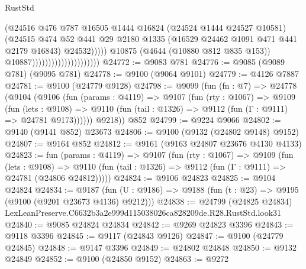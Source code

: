 \begin{lexlean}{RustStd}
\begin{coremodule}
                                                    (@24516
                                                      @476
                                                      @787
                                                      @16505
                                                      @1444
                                                      @16824
                                                      (@24524 @1444 @24527 @10581)
                                                      (@24515
                                                        @474
                                                        @52
                                                        @441
                                                        @29
                                                        @2180
                                                        @1335
                                                        (@16529 @24462 @1091 @471 @441 @2179 @16843)
                                                        @24532)))))
                                              @10875
                                              (@4644 (@10880 @812 @835 @153))
                                              @10887)))))))))))))))))))))
@24772 := @9083 @781
@24776 := @9085 (@9089 @781) (@9095 @781)
@24778 := @9100 (@9064 @9101)
@24779 := @4126 @7887
@24781 := @9100 (@24779 @9128)
@24798 := @9099
    (fun (fn : @7) =>
    @24778
      (@9104
        (@9106
          (fun (params : @4119) =>
          @9107
            (fun (rty : @1067) =>
            @9109
              (fun (lets : @9108) =>
              @9110 (fun (tail : @1326) => @9112 (fun (Γ : @9111) => @24781 @9173))))))
        @9218))
    @852
@24799 := @9224 @9066
@24802 := @9140 (@9141 @852) @23673
@24806 := @9100 (@9132 (@24802 @9148) @9152)
@24807 := @9164 @852
@24812 := @9161 (@9163 @24807 @23676 @4130 @4133)
@24823 := fun (params : @4119) =>
  @9107
    (fun (rty : @1067) =>
    @9109
      (fun (lets : @9108) =>
      @9110 (fun (tail : @1326) => @9112 (fun (Γ : @9111) => @24781 (@24806 @24812)))))
@24824 := @9106 @24823
@24825 := @9104 @24824
@24834 := @9187
    (fun (U : @9186) => @9188 (fun (t : @23) => @9195 (@9100 (@9201 @23673 @4136) @9212)))
@24838 := @24799
    (@24825 @24834)
    LexLeanPreserve.C6632b3a2e999d115038026ca828209de.R28.RustStd.look31
@24840 := @9085 @24824 @24834
@24842 := @9269 @24823 @3396
@24843 := @9118 @3396
@24845 := @9117 (@24843 @9126)
@24847 := @9100 (@24779 @24845)
@24848 := @9147 @3396
@24849 := @24802 @24848
@24850 := @9132 @24849
@24852 := @9100 (@24850 @9152)
@24863 := @9272

\end{coremodule}
\end{lexlean}
